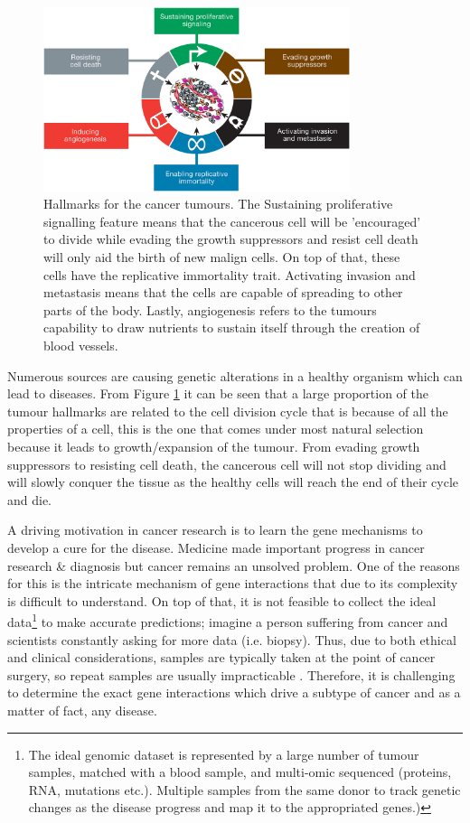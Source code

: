 \begin{figure}[!ht]
  \centering\includegraphics[width=0.8\textwidth,height=0.8\textheight,keepaspectratio]{Images/TCGA/tumour_causes}
    \caption{Hallmarks for the cancer tumours\cite{Hanahan2011-px}. The Sustaining proliferative signalling feature means that the cancerous cell will be 'encouraged' to divide while evading the growth suppressors and resist cell death will only aid the birth of new malign cells. On top of that, these cells have the replicative immortality trait. Activating invasion and metastasis means that the cells are capable of spreading to other parts of the body. Lastly, angiogenesis refers to the tumours capability to draw nutrients to sustain itself through the creation of blood vessels. }
    \label{fig:hallmarks_cancer}
\end{figure}

Numerous sources are causing genetic alterations in a healthy organism which can lead to diseases. From Figure \ref{fig:hallmarks_cancer} it can be seen that a large proportion of the tumour hallmarks are related to the cell division cycle that is because of all the properties of a cell, this is the one that comes under most natural selection because it leads to growth/expansion of the tumour. From evading growth suppressors to resisting cell death, the cancerous cell will not stop dividing and will slowly conquer the tissue as the healthy cells will reach the end of their cycle and die.

A driving motivation in cancer research is to learn the gene mechanisms to develop a cure for the disease. Medicine made important progress in cancer research \& diagnosis but cancer remains an unsolved problem. One of the reasons for this is the intricate mechanism of gene interactions that due to its complexity is difficult to understand. On top of that, it is not feasible to collect the ideal data\footnote{The ideal genomic dataset is represented by a large number of tumour samples, matched with a blood sample, and multi-omic sequenced (proteins, RNA, mutations etc.). Multiple samples from the same donor to track genetic changes as the disease progress and map it to the appropriated genes.)} to make accurate predictions; imagine a person suffering from cancer and scientists constantly asking for more data (i.e. biopsy). Thus, due to both ethical and clinical considerations, samples are typically taken at the point of cancer surgery, so repeat samples are usually impracticable . Therefore, it is challenging to determine the exact gene interactions which drive a subtype of cancer and as a matter of fact, any disease. 

